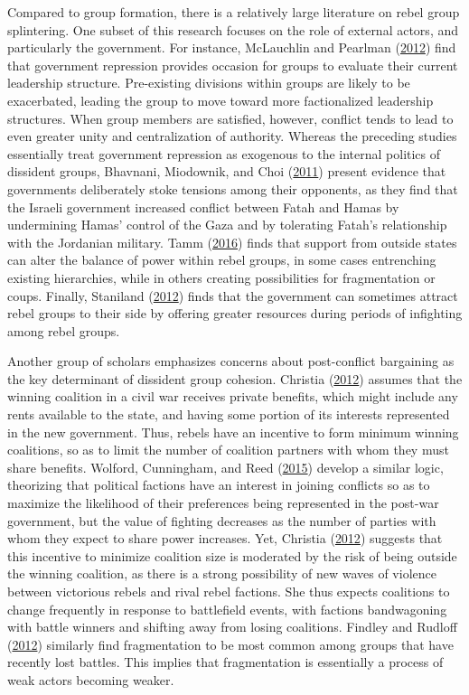 \documentclass[12pt,]{book}
\theoremstyle{definition}
\theoremstyle{definition}
\theoremstyle{remark}
\begin{document}
Compared to group formation, there is a relatively large literature on
rebel group splintering. One subset of this research focuses on the role
of external actors, and particularly the government. For instance,
McLauchlin and Pearlman (\protect\hyperlink{ref-McLauchlin2012}{2012})
find that government repression provides occasion for groups to evaluate
their current leadership structure. Pre-existing divisions within groups
are likely to be exacerbated, leading the group to move toward more
factionalized leadership structures. When group members are satisfied,
however, conflict tends to lead to even greater unity and centralization
of authority. Whereas the preceding studies essentially treat government
repression as exogenous to the internal politics of dissident groups,
Bhavnani, Miodownik, and Choi
(\protect\hyperlink{ref-Bhavnani2011}{2011}) present evidence that
governments deliberately stoke tensions among their opponents, as they
find that the Israeli government increased conflict between Fatah and
Hamas by undermining Hamas' control of the Gaza and by tolerating
Fatah's relationship with the Jordanian military. Tamm
(\protect\hyperlink{ref-Tamm2016}{2016}) finds that support from outside
states can alter the balance of power within rebel groups, in some cases
entrenching existing hierarchies, while in others creating possibilities
for fragmentation or coups. Finally, Staniland
(\protect\hyperlink{ref-Staniland2012d}{2012}) finds that the government
can sometimes attract rebel groups to their side by offering greater
resources during periods of infighting among rebel groups.

Another group of scholars emphasizes concerns about post-conflict
bargaining as the key determinant of dissident group cohesion. Christia
(\protect\hyperlink{ref-Christia2012}{2012}) assumes that the winning
coalition in a civil war receives private benefits, which might include
any rents available to the state, and having some portion of its
interests represented in the new government. Thus, rebels have an
incentive to form minimum winning coalitions, so as to limit the number
of coalition partners with whom they must share benefits. Wolford,
Cunningham, and Reed (\protect\hyperlink{ref-Wolford}{2015}) develop a
similar logic, theorizing that political factions have an interest in
joining conflicts so as to maximize the likelihood of their preferences
being represented in the post-war government, but the value of fighting
decreases as the number of parties with whom they expect to share power
increases. Yet, Christia (\protect\hyperlink{ref-Christia2012}{2012})
suggests that this incentive to minimize coalition size is moderated by
the risk of being outside the winning coalition, as there is a strong
possibility of new waves of violence between victorious rebels and rival
rebel factions. She thus expects coalitions to change frequently in
response to battlefield events, with factions bandwagoning with battle
winners and shifting away from losing coalitions. Findley and Rudloff
(\protect\hyperlink{ref-Findley2012}{2012}) similarly find fragmentation
to be most common among groups that have recently lost battles. This
implies that fragmentation is essentially a process of weak actors
becoming weaker.
\end{document}
